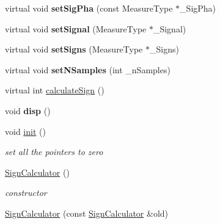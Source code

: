 \begin{DoxyCompactItemize}
\item 
\hypertarget{class_ox_1_1_sign_calculator_a1fe78e188915e35e8d0db885642852c9}{virtual void {\bfseries set\-Sig\-Pha} (const Measure\-Type $\ast$\-\_\-\-Sig\-Pha)}\label{class_ox_1_1_sign_calculator_a1fe78e188915e35e8d0db885642852c9}

\item 
\hypertarget{class_ox_1_1_sign_calculator_ade6aa249b05f92357cb825065be8a203}{virtual void {\bfseries set\-Signal} (Measure\-Type $\ast$\-\_\-\-Signal)}\label{class_ox_1_1_sign_calculator_ade6aa249b05f92357cb825065be8a203}

\item 
\hypertarget{class_ox_1_1_sign_calculator_a3de14f899f64c93df9076fb837e553bf}{virtual void {\bfseries set\-Signs} (Measure\-Type $\ast$\-\_\-\-Signs)}\label{class_ox_1_1_sign_calculator_a3de14f899f64c93df9076fb837e553bf}

\item 
\hypertarget{class_ox_1_1_sign_calculator_a8a4f3f8b94fad53d444cf6f1c1191497}{virtual void {\bfseries set\-N\-Samples} (int \-\_\-n\-Samples)}\label{class_ox_1_1_sign_calculator_a8a4f3f8b94fad53d444cf6f1c1191497}

\item 
virtual int \hyperlink{class_ox_1_1_sign_calculator_ab7f0a44979db34b15a78a8b755f6c103}{calculate\-Sign} ()
\item 
\hypertarget{class_ox_1_1_sign_calculator_a19457e1c9204a3156f646ad11e1bfe1a}{void {\bfseries disp} ()}\label{class_ox_1_1_sign_calculator_a19457e1c9204a3156f646ad11e1bfe1a}

\item 
\hypertarget{class_ox_1_1_sign_calculator_afb2259d9a13f8d58945448923b63165a}{void \hyperlink{class_ox_1_1_sign_calculator_afb2259d9a13f8d58945448923b63165a}{init} ()}\label{class_ox_1_1_sign_calculator_afb2259d9a13f8d58945448923b63165a}

\begin{DoxyCompactList}\small\item\em set all the pointers to zero \end{DoxyCompactList}\item 
\hypertarget{class_ox_1_1_sign_calculator_a1b0a177a5f2c6080d6730ff5fdc384af}{\hyperlink{class_ox_1_1_sign_calculator_a1b0a177a5f2c6080d6730ff5fdc384af}{Sign\-Calculator} ()}\label{class_ox_1_1_sign_calculator_a1b0a177a5f2c6080d6730ff5fdc384af}

\begin{DoxyCompactList}\small\item\em constructor \end{DoxyCompactList}\item 
\hypertarget{class_ox_1_1_sign_calculator_a118469032ecb643b93ba56f948fdce85}{\hyperlink{class_ox_1_1_sign_calculator_a118469032ecb643b93ba56f948fdce85}{Sign\-Calculator} (const \hyperlink{class_ox_1_1_sign_calculator}{Sign\-Calculator} \&old)}\label{class_ox_1_1_sign_calculator_a118469032ecb643b93ba56f948fdce85}


\end{DoxyCompactItemize}
